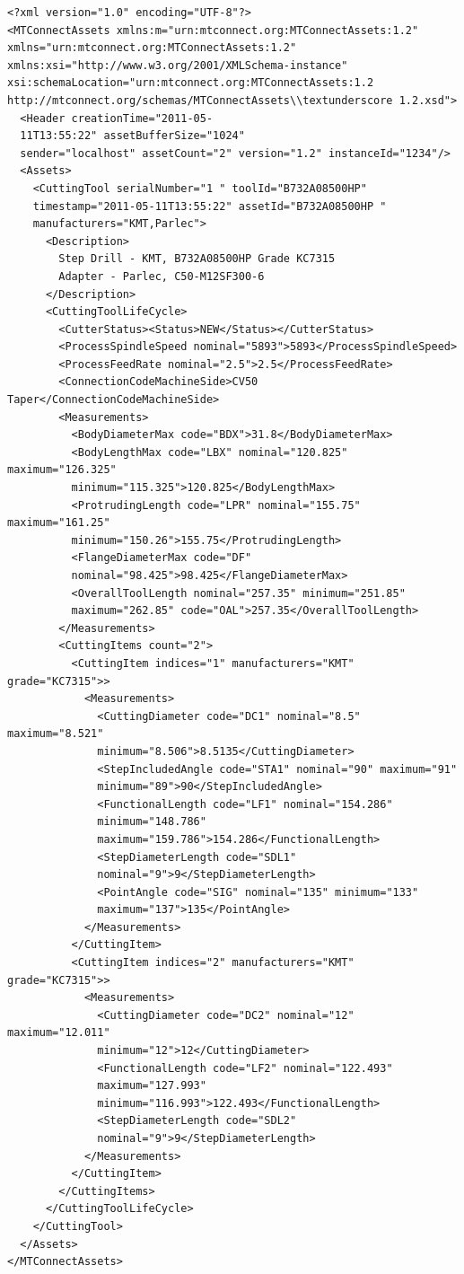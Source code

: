 \begin{lstlisting}[firstnumber=1,escapechar=|,% 
caption={Example for Step Mill Side View}, label={lst:step-drill-side-view}]
<?xml version="1.0" encoding="UTF-8"?>
<MTConnectAssets xmlns:m="urn:mtconnect.org:MTConnectAssets:1.2" 
xmlns="urn:mtconnect.org:MTConnectAssets:1.2" 
xmlns:xsi="http://www.w3.org/2001/XMLSchema-instance" 
xsi:schemaLocation="urn:mtconnect.org:MTConnectAssets:1.2 
http://mtconnect.org/schemas/MTConnectAssets\\textunderscore 1.2.xsd">
  <Header creationTime="2011-05-
  11T13:55:22" assetBufferSize="1024" 
  sender="localhost" assetCount="2" version="1.2" instanceId="1234"/>
  <Assets>
    <CuttingTool serialNumber="1 " toolId="B732A08500HP" 
    timestamp="2011-05-11T13:55:22" assetId="B732A08500HP " 
    manufacturers="KMT,Parlec">
      <Description>
        Step Drill - KMT, B732A08500HP Grade KC7315
        Adapter - Parlec, C50-M12SF300-6
      </Description>
      <CuttingToolLifeCycle>
        <CutterStatus><Status>NEW</Status></CutterStatus>
        <ProcessSpindleSpeed nominal="5893">5893</ProcessSpindleSpeed>
        <ProcessFeedRate nominal="2.5">2.5</ProcessFeedRate>
        <ConnectionCodeMachineSide>CV50 Taper</ConnectionCodeMachineSide>
        <Measurements>
          <BodyDiameterMax code="BDX">31.8</BodyDiameterMax>
          <BodyLengthMax code="LBX" nominal="120.825" maximum="126.325" 
          minimum="115.325">120.825</BodyLengthMax>
          <ProtrudingLength code="LPR" nominal="155.75" maximum="161.25" 
          minimum="150.26">155.75</ProtrudingLength>
          <FlangeDiameterMax code="DF" 
          nominal="98.425">98.425</FlangeDiameterMax>
          <OverallToolLength nominal="257.35" minimum="251.85" 
          maximum="262.85" code="OAL">257.35</OverallToolLength>
        </Measurements>
        <CuttingItems count="2">
          <CuttingItem indices="1" manufacturers="KMT" grade="KC7315">>
            <Measurements>
              <CuttingDiameter code="DC1" nominal="8.5" maximum="8.521" 
              minimum="8.506">8.5135</CuttingDiameter>
              <StepIncludedAngle code="STA1" nominal="90" maximum="91" 
              minimum="89">90</StepIncludedAngle>
              <FunctionalLength code="LF1" nominal="154.286" 
              minimum="148.786" 
              maximum="159.786">154.286</FunctionalLength>
              <StepDiameterLength code="SDL1" 
              nominal="9">9</StepDiameterLength>
              <PointAngle code="SIG" nominal="135" minimum="133" 
              maximum="137">135</PointAngle>
            </Measurements>
          </CuttingItem>
          <CuttingItem indices="2" manufacturers="KMT" grade="KC7315">>
            <Measurements>
              <CuttingDiameter code="DC2" nominal="12" maximum="12.011" 
              minimum="12">12</CuttingDiameter>
              <FunctionalLength code="LF2" nominal="122.493" 
              maximum="127.993" 
              minimum="116.993">122.493</FunctionalLength>
              <StepDiameterLength code="SDL2" 
              nominal="9">9</StepDiameterLength>
            </Measurements>
          </CuttingItem>
        </CuttingItems>
      </CuttingToolLifeCycle>
    </CuttingTool>
  </Assets>
</MTConnectAssets>
\end{lstlisting}

